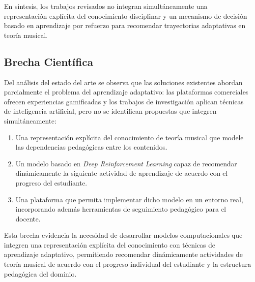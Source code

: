 En síntesis, los trabajos revisados no integran simultáneamente una representación explícita del conocimiento disciplinar y un mecanismo de decisión basado en aprendizaje por refuerzo para recomendar trayectorias adaptativas en teoría musical.

\subsection{Brecha Científica}

Del análisis del estado del arte se observa que las soluciones existentes abordan parcialmente el problema del aprendizaje adaptativo: las plataformas comerciales ofrecen experiencias gamificadas y los trabajos de investigación aplican técnicas de inteligencia artificial, pero no se identifican propuestas que integren simultáneamente:

\begin{enumerate}

\item Una representación explícita del conocimiento de teoría musical que modele las dependencias pedagógicas entre los contenidos.

\item Un modelo basado en \textit{Deep Reinforcement Learning} capaz de recomendar dinámicamente la siguiente actividad de aprendizaje de acuerdo con el progreso del estudiante.

\item Una plataforma que permita implementar dicho modelo en un entorno real, incorporando además herramientas de seguimiento pedagógico para el docente.

\end{enumerate}

Esta brecha evidencia la necesidad de desarrollar modelos computacionales que integren una representación explícita del conocimiento con técnicas de aprendizaje adaptativo, permitiendo recomendar dinámicamente actividades de teoría musical de acuerdo con el progreso individual del estudiante y la estructura pedagógica del dominio.